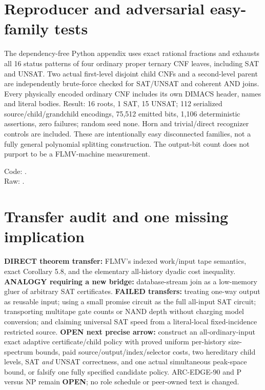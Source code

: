 \documentclass[11pt]{article}
\newcommand{\OPEN}{\textbf{OPEN}}
\begin{document}
\section{Reproducer and adversarial easy-family tests}
The dependency-free Python appendix uses exact rational fractions and exhausts all 16 status patterns of four ordinary proper ternary CNF leaves, including SAT and UNSAT. Two actual first-level disjoint child CNFs and a second-level parent are independently brute-force checked for SAT/UNSAT and coherent AND joins. Every physically encoded ordinary CNF includes its own DIMACS header, names and literal bodies. Result: 16 roots, 1 SAT, 15 UNSAT; 112 serialized source/child/grandchild encodings, 75,512 emitted bits, 1,106 deterministic assertions, zero failures; random seed none. Horn and trivial/direct recognizer controls are included. These are intentionally easy disconnected families, not a fully general polynomial splitting construction. The output-bit count does not purport to be a FLMV-machine measurement.

\noindent Code: .\\
Raw: .

\section{Transfer audit and one missing implication}
\textbf{DIRECT theorem transfer:} FLMV's indexed work/input tape semantics, exact Corollary 5.8, and the elementary all-history dyadic cost inequality. \textbf{ANALOGY requiring a new bridge:} database-stream join as a low-memory gluer of arbitrary SAT certificates. \textbf{FAILED transfers:} treating one-way output as reusable input; using a small promise circuit as the full all-input SAT circuit; transporting multitape gate counts or NAND depth without charging model conversion; and claiming universal SAT speed from a literal-local fixed-incidence restricted source.
\textbf{OPEN next precise arrow:} construct an all-ordinary-input exact adaptive certificate/child policy with proved uniform per-history size-spectrum bounds, paid source/output/index/selector costs, two hereditary child levels, SAT \emph{and} UNSAT correctness, and one actual simultaneous peak-space bound, or falsify one fully specified candidate policy. ARC-EDGE-90 and P versus NP remain \OPEN{}; no role schedule or peer-owned text is changed.
\end{document}
